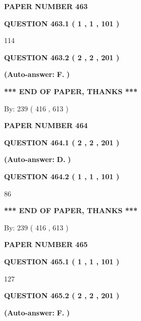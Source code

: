 \documentclass{ctexart}
\begin{document}
   
 {\textbf{ \Large{ PAPER NUMBER  463  }}}
   
   
   
   
  
  
{\textbf{\large{QUESTION
463.1 
 ( 1 , 1 , 101 )
}}}

114
  
  
{\textbf{\large{QUESTION
463.2 
 ( 2 , 2 , 201 )
}}}
 
 
{\textbf{(Auto-answer:}}
{\textbf{\large{
F.}}}
{\textbf{)}}
 
 
   
   
   
   
\vspace{1.0in} 
{\textbf{\large{ *** END OF PAPER, THANKS *** }}} 
   
   
\hspace{1.0in} By: 
 239 ( 416 ,  613 )
   
   
   
   
\newpage 
\setcounter{page}{ 
   464001 } 
   
   
 {\textbf{ \Large{ PAPER NUMBER  464  }}}
   
   
   
   
  
  
{\textbf{\large{QUESTION
464.1 
 ( 2 , 2 , 201 )
}}}
 
 
{\textbf{(Auto-answer:}}
{\textbf{\large{
D.}}}
{\textbf{)}}
 
 
  
  
{\textbf{\large{QUESTION
464.2 
 ( 1 , 1 , 101 )
}}}

86
   
   
   
   
\vspace{1.0in} 
{\textbf{\large{ *** END OF PAPER, THANKS *** }}} 
   
   
\hspace{1.0in} By: 
 239 ( 416 ,  613 )
   
   
   
   
\newpage 
\setcounter{page}{ 
   465001 } 
   
   
 {\textbf{ \Large{ PAPER NUMBER  465  }}}
   
   
   
   
  
  
{\textbf{\large{QUESTION
465.1 
 ( 1 , 1 , 101 )
}}}

127
  
  
{\textbf{\large{QUESTION
465.2 
 ( 2 , 2 , 201 )
}}}
 
 
{\textbf{(Auto-answer:}}
{\textbf{\large{
F.}}}
{\textbf{)}}
 
\end{document}
